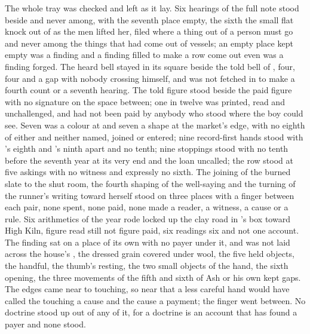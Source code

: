 The whole tray was checked and left as it lay. Six hearings of the full note stood beside and never among, with the seventh place empty, the sixth the small flat knock out of  as the men lifted her, filed where a thing out of a person must go and never among the things that had come out of vessels; an empty place kept empty was a finding and a finding filled to make a row come out even was a finding forged. The heard bell stayed in its square beside the told bell of , four, four and a gap with nobody crossing himself, and was not fetched in to make a fourth count or a seventh hearing. The told figure stood beside the paid figure with no signature on the space between; one in twelve was printed, read and unchallenged, and had not been paid by anybody who stood where the boy could see. Seven was a colour at  and seven a shape at the market's edge, with no eighth of either and neither named, joined or entered; nine record-first hands stood with 's eighth and 's ninth apart and no tenth; nine stoppings stood with no tenth before the seventh year at its very end and the loan uncalled; the row stood at five askings with no witness and expressly no sixth. The joining of the burned slate to the shut room, the fourth shaping of the well-saying and the turning of the runner's writing toward herself stood on three places with a finger between each pair, none spent, none paid, none made a reader, a witness, a cause or a rule. Six arithmetics of the year rode locked up the clay road in 's box toward High Kiln, figure read still not figure paid, six readings six and not one account. The finding sat on a place of its own with no payer under it, and was not laid across the house's , the dressed grain covered under wool, the five held objects, the handful, the thumb's resting, the two small objects of the hand, the sixth opening, the three movements of the fifth and sixth of Ash or his own kept gaps. The edges came near to touching, so near that a less careful hand would have called the touching a cause and the cause a payment; the finger went between. No doctrine stood up out of any of it, for a doctrine is an account that has found a payer and none stood.

